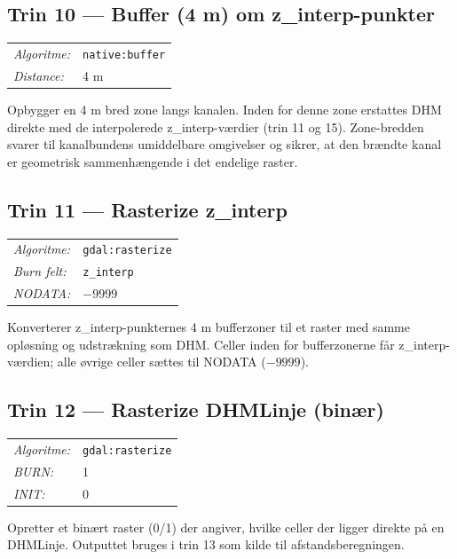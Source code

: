 \subsection{Trin 10 — Buffer (4 m) om z\_interp-punkter}

\begin{tabular}{ll}
  \textit{Algoritme:} & \texttt{native:buffer} \\
  \textit{Distance:}  & 4 m \\
\end{tabular}

\medskip
Opbygger en 4 m bred zone langs kanalen. Inden for denne zone erstattes DHM
direkte med de interpolerede z\_interp-værdier (trin 11 og 15). Zone-bredden
svarer til kanalbundens umiddelbare omgivelser og sikrer, at den brændte kanal
er geometrisk sammenhængende i det endelige raster.

\subsection{Trin 11 — Rasterize z\_interp}

\begin{tabular}{ll}
  \textit{Algoritme:} & \texttt{gdal:rasterize} \\
  \textit{Burn felt:} & \texttt{z\_interp} \\
  \textit{NODATA:}    & $-9999$ \\
\end{tabular}

\medskip
Konverterer z\_interp-punkternes 4 m bufferzoner til et raster med samme
opløsning og udstrækning som DHM. Celler inden for bufferzonerne får
z\_interp-værdien; alle øvrige celler sættes til NODATA ($-9999$).

\subsection{Trin 12 — Rasterize DHMLinje (binær)}

\begin{tabular}{ll}
  \textit{Algoritme:} & \texttt{gdal:rasterize} \\
  \textit{BURN:}      & 1 \\
  \textit{INIT:}      & 0 \\
\end{tabular}

\medskip
Opretter et binært raster (0/1) der angiver, hvilke celler der ligger direkte
på en DHMLinje. Outputtet bruges i trin 13 som kilde til afstandsberegningen.

